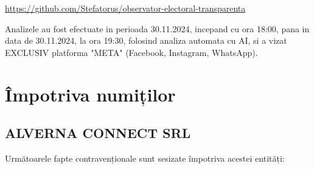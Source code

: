 \documentclass[a4paper,12pt]{article}
\begin{document}
\href{https://github.com/Stefatorus/observator-electoral-transparenta}{https://github.com/Stefatorus/observator-electoral-transparenta}

Analizele au fost efectuate in perioada 30.11.2024, incepand cu ora 18:00, pana in data de 30.11.2024, la ora 19:30, folosind analiza automata cu AI, si a vizat EXCLUSIV platforma "META" (Facebook, Instagram, WhatsApp).

\tableofcontents
\newpage

\section{Împotriva numiților}

\subsection{ALVERNA CONNECT SRL}
Următoarele fapte contravenționale sunt sesizate împotriva acestei entități:
\end{document}
